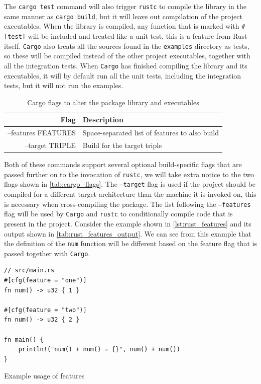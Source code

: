 The \texttt{cargo test} command will also trigger \texttt{rustc} to compile the library in the same manner as \texttt{cargo build}, but it will leave out compilation of the project executables.
When the library is compiled, any function that is marked with \texttt{\#[test]} will be included and treated like a unit test, this is a feature from Rust itself.
\texttt{Cargo} also treats all the sources found in the \texttt{examples} directory as tests, so these will be compiled instead of the other project executables, together with all the integration tests.
When \texttt{Cargo} has finished compiling the library and its executables, it will by default run all the unit tests, including the integration tests, but it will not run the examples.

\begin{table}[ht]
\begin{center}
\begin{tabular}{r|l}
\textbf{Flag} & \textbf{Description}                                   \\
\hline
--features FEATURES   & Space-separated list of features to also build \\
--target TRIPLE       & Build for the target triple                    \\
\hline
\end{tabular}
\caption{Cargo flags to alter the package library and executables}
\label{tab:cargo_flags}
\end{center}
\end{table}

Both of these commands support several optional build-specific flags that are passed further on to the invocation of \texttt{rustc}, we will take extra notice to the two flags shown in \autoref{tab:cargo_flags}.
The \texttt{--target} flag is used if the project should be compiled for a different target architecture than the machine it is invoked on, this is necessary when cross-compiling the package.
The list following the \texttt{--features} flag will be used by \texttt{Cargo} and \texttt{rustc} to conditionally compile code that is present in the project.
Consider the example shown in \autoref{lst:rust_features} and its output shown in \autoref{tab:rust_features_output}.
We can see from this example that the definition of the \texttt{num} function will be different based on the feature flag that is passed together with \texttt{Cargo}.

\begin{listing}[H]
\begin{verbatim}
// src/main.rs
#[cfg(feature = "one")]
fn num() -> u32 { 1 }

#[cfg(feature = "two")]
fn num() -> u32 { 2 }

fn main() {
    println!("num() + num() = {}", num() + num())
}
\end{verbatim}
\caption{Example usage of features}
\label{lst:rust_features}
\end{listing}

